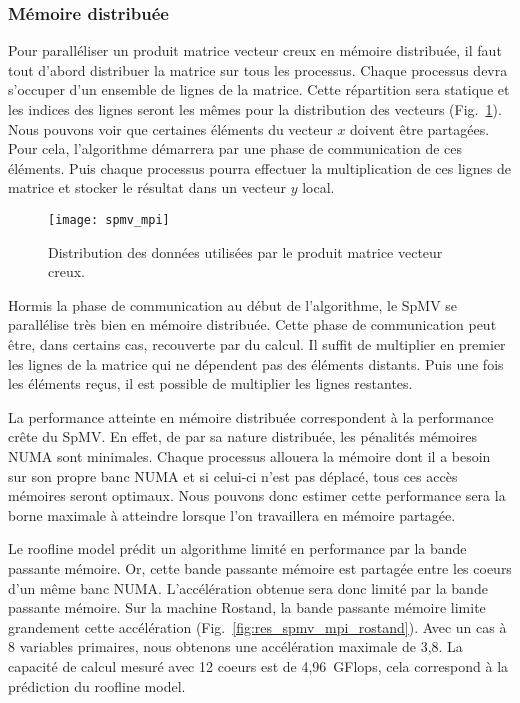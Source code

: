 \subsubsection{Mémoire distribuée}
Pour paralléliser un produit matrice vecteur creux en mémoire distribuée, il faut tout d'abord distribuer la matrice sur tous les processus.
%
Chaque processus devra s'occuper d'un ensemble de lignes de la matrice.
%
Cette répartition sera statique et les indices des lignes seront les mêmes pour la distribution des vecteurs (Fig.~\ref{fig:spmv_mpi}).
%
Nous pouvons voir que certaines éléments du vecteur $x$ doivent être partagées.
%
Pour cela, l'algorithme démarrera par une phase de communication de ces éléments.
%
Puis chaque processus pourra effectuer la multiplication de ces lignes de matrice et stocker le résultat dans un vecteur $y$ local.

\begin{figure}
  \centering
  \texttt{[image: spmv\_mpi]}
  \caption{Distribution des données utilisées par le produit matrice vecteur creux.}
  \label{fig:spmv_mpi}
\end{figure}

Hormis la phase de communication au début de l'algorithme, le SpMV se parallélise très bien en mémoire distribuée.
%
Cette phase de communication peut être, dans certains cas, recouverte par du calcul.
%
Il suffit de multiplier en premier les lignes de la matrice qui ne dépendent pas des éléments distants.
%
Puis une fois les éléments reçus, il est possible de multiplier les lignes restantes.



La performance atteinte en mémoire distribuée correspondent à la performance crête du SpMV.
%
En effet, de par sa nature distribuée, les pénalités mémoires NUMA sont minimales.
%
Chaque processus allouera la mémoire dont il a besoin sur son propre banc NUMA et si celui-ci n'est pas déplacé, tous ces accès mémoires seront optimaux.
%
Nous pouvons donc estimer cette performance sera la borne maximale à atteindre lorsque l'on travaillera en mémoire partagée.




Le roofline model prédit un algorithme limité en performance par la bande passante mémoire.
%
Or, cette bande passante mémoire est partagée entre les coeurs d'un même banc NUMA.
%
L'accélération obtenue sera donc limité par la bande passante mémoire.
%
Sur la machine Rostand, la bande passante mémoire limite grandement cette accélération (Fig.~\ref{fig:res_spmv_mpi_rostand}).
%
Avec un cas à 8 variables primaires, nous obtenons une accélération maximale de 3,8.
%
La capacité de calcul mesuré avec 12 coeurs est de 4,96~GFlops, cela correspond à la prédiction du roofline model.


